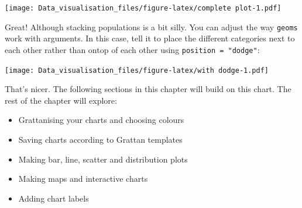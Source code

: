 \documentclass[]{book}
\newenvironment{Shaded}{\begin{snugshade}}{\end{snugshade}}
\newcommand{\DataTypeTok}[1]{\textcolor[rgb]{0.13,0.29,0.53}{#1}}
\newcommand{\KeywordTok}[1]{\textcolor[rgb]{0.13,0.29,0.53}{\textbf{#1}}}
\newcommand{\NormalTok}[1]{#1}
\newcommand{\OperatorTok}[1]{\textcolor[rgb]{0.81,0.36,0.00}{\textbf{#1}}}
\newcommand{\StringTok}[1]{\textcolor[rgb]{0.31,0.60,0.02}{#1}}
\providecommand{\tightlist}{%
  \setlength{\itemsep}{0pt}\setlength{\parskip}{0pt}}
\begin{document}
\begin{Shaded}
\end{Shaded}

\texttt{[image: Data\_visualisation\_files/figure-latex/complete plot-1.pdf]}

Great! Although stacking populations is a bit silly. You can adjust the way \texttt{geoms} work with arguments. In this case, tell it to place the different categories next to each other rather than ontop of each other using \texttt{position\ =\ "dodge"}:

\begin{Shaded}
\end{Shaded}

\texttt{[image: Data\_visualisation\_files/figure-latex/with dodge-1.pdf]}

That's nicer. The following sections in this chapter will build on this chart. The rest of the chapter will explore:

\begin{itemize}
\tightlist
\item
  Grattanising your charts and choosing colours
\item
  Saving charts according to Grattan templates
\item
  Making bar, line, scatter and distribution plots
\item
  Making maps and interactive charts
\item
  Adding chart labels
\end{itemize}
\end{document}
